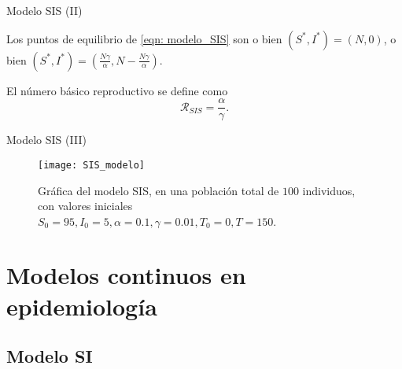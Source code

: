 \begin{frame}{Modelo SIS (II)}

        
        

    \begin{lema}
        Los puntos de equilibrio de \eqref{eqn: modelo_SIS} son o bien $(S^*,I^*)=(N,0)$, o bien $(S^*,I^*)=(\frac{N\gamma}{\alpha}, N-\frac{N\gamma}{\alpha})$.
    \end{lema}

    \pause

    \begin{definition}
        El número básico reproductivo se define como 
        $$\mathcal{R}_{SIS}=\frac{\alpha}{\gamma}.$$
    \end{definition}
\end{frame}


\begin{frame}{Modelo SIS (III)}


    \begin{figure}
        \begin{center}
        \caption{Gráfica del modelo SIS, en una población total de $100$ individuos, con valores iniciales $S_0=95, I_0 = 5, \alpha = 0.1, \gamma=0.01, T_0 = 0, T = 150$.}
        \texttt{[image: SIS\_modelo]}
        \end{center}
    \end{figure}

\end{frame}




\section{Modelos continuos en epidemiología}


\subsection{Modelo SI}


